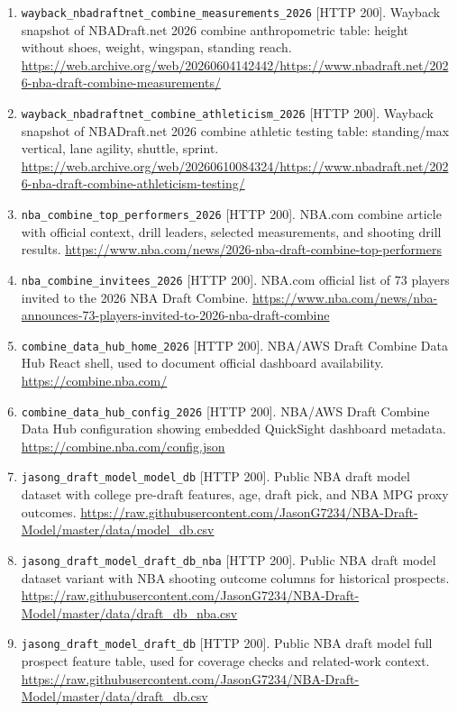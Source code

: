 \documentclass[11pt]{article}
\begin{document}
\begin{enumerate}[leftmargin=*, itemsep=2pt]
\item \texttt{wayback\_nbadraftnet\_combine\_measurements\_2026} [HTTP 200]. Wayback snapshot of NBADraft.net 2026 combine anthropometric table: height without shoes, weight, wingspan, standing reach. \url{https://web.archive.org/web/20260604142442/https://www.nbadraft.net/2026-nba-draft-combine-measurements/}
\item \texttt{wayback\_nbadraftnet\_combine\_athleticism\_2026} [HTTP 200]. Wayback snapshot of NBADraft.net 2026 combine athletic testing table: standing/max vertical, lane agility, shuttle, sprint. \url{https://web.archive.org/web/20260610084324/https://www.nbadraft.net/2026-nba-draft-combine-athleticism-testing/}
\item \texttt{nba\_combine\_top\_performers\_2026} [HTTP 200]. NBA.com combine article with official context, drill leaders, selected measurements, and shooting drill results. \url{https://www.nba.com/news/2026-nba-draft-combine-top-performers}
\item \texttt{nba\_combine\_invitees\_2026} [HTTP 200]. NBA.com official list of 73 players invited to the 2026 NBA Draft Combine. \url{https://www.nba.com/news/nba-announces-73-players-invited-to-2026-nba-draft-combine}
\item \texttt{combine\_data\_hub\_home\_2026} [HTTP 200]. NBA/AWS Draft Combine Data Hub React shell, used to document official dashboard availability. \url{https://combine.nba.com/}
\item \texttt{combine\_data\_hub\_config\_2026} [HTTP 200]. NBA/AWS Draft Combine Data Hub configuration showing embedded QuickSight dashboard metadata. \url{https://combine.nba.com/config.json}
\item \texttt{jasong\_draft\_model\_model\_db} [HTTP 200]. Public NBA draft model dataset with college pre-draft features, age, draft pick, and NBA MPG proxy outcomes. \url{https://raw.githubusercontent.com/JasonG7234/NBA-Draft-Model/master/data/model_db.csv}
\item \texttt{jasong\_draft\_model\_draft\_db\_nba} [HTTP 200]. Public NBA draft model dataset variant with NBA shooting outcome columns for historical prospects. \url{https://raw.githubusercontent.com/JasonG7234/NBA-Draft-Model/master/data/draft_db_nba.csv}
\item \texttt{jasong\_draft\_model\_draft\_db} [HTTP 200]. Public NBA draft model full prospect feature table, used for coverage checks and related-work context. \url{https://raw.githubusercontent.com/JasonG7234/NBA-Draft-Model/master/data/draft_db.csv}

\end{enumerate}
\end{document}
